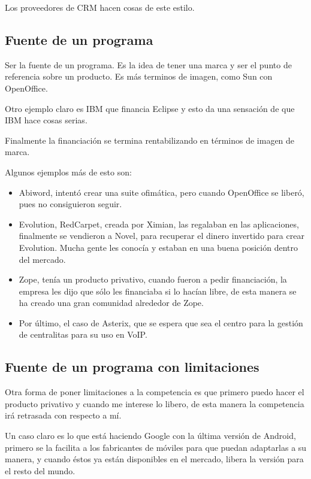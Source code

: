 Los proveedores de CRM hacen cosas de este estilo.


\subsection{Fuente de un programa}

Ser la fuente de un programa. Es la idea de tener una marca y ser el punto de
referencia sobre un producto. Es más terminos de imagen, como Sun con OpenOffice.

Otro ejemplo claro es IBM que financia Eclipse y esto da una sensación de que
IBM hace cosas serias.

Finalmente la financiación se termina rentabilizando en términos de imagen de
marca.

Algunos ejemplos más de esto son:
\begin{itemize}
 \item Abiword, intentó crear una suite ofimática, pero cuando OpenOffice se liberó,
pues no consiguieron seguir.
\item Evolution, RedCarpet, creada por Ximian, las regalaban en las
aplicaciones, finalmente se vendieron a Novel, para recuperar el dinero
invertido para crear Evolution. Mucha gente les conocía y estaban en una buena
posición dentro del mercado.
\item Zope, tenía un producto privativo, cuando fueron a pedir financiación, la
empresa les dijo que sólo les financiaba si lo hacían libre, de esta manera se
ha creado una gran comunidad alrededor de Zope.
\item Por último, el caso de Asterix, que se espera que sea el centro para la
gestión de centralitas para su uso en VoIP.
\end{itemize}



\subsection{Fuente de un programa con limitaciones}

Otra forma de poner limitaciones a la competencia es que primero puedo hacer el
producto privativo y cuando me interese lo libero, de esta manera la competencia
irá retrasada con respecto a mí.

Un caso claro es lo que está haciendo Google con la última versión de Android,
primero se la facilita a los fabricantes de móviles para que puedan adaptarlas a
su manera, y cuando éstos ya están disponibles en el mercado, libera la versión
para el resto del mundo.

